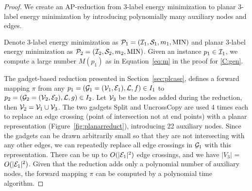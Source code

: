 
\Tplanar*
\begin{proof}



We create an AP-reduction from 3-label energy minimization to planar 3-label energy minimization by introducing polynomially many auxiliary nodes and edges.

Denote 3-label energy minimization as $ \mathcal{P}_1 = (\mathcal{I}_1, \mathcal{S}_1, m_1, \text{MIN})$ and planar 3-label energy minimization as $\mathcal{P}_2 = (\mathcal{I}_2, \mathcal{S}_2, m_2, \text{MIN})$.
Given an instance $p_1 \in \mathcal{I}_1$, we compute a large number $M(p_1)$ as in Equation~\cref{eq:m} in the proof for \cref{C:gen}.

The gadget-based reduction presented in Section~\ref{sec:plcase}, defines a forward mapping $\pi$ from any $p_1 = (\mathcal{G}_1 = (\mathcal{V}_1, \mathcal{E}_1), \mathcal{L}, f) \in I_1$ to $p_2 = (\mathcal{G}_2 = (\mathcal{V}_2, \mathcal{E}_2), \mathcal{L}, g) \in I_2$. Let $\mathcal{V}_3$ be the nodes added during the reduction, then $\mathcal{V}_2 = \mathcal{V}_1 \cup \mathcal{V}_3$. The two gadgets {\sc Split} and {\sc UncrossCopy} are used 4 times each to replace an edge crossing (point of intersection not at end points) with a planar representation (Figure~\ref{fig:planarreduct}), introducing 22 auxiliary nodes. Since the gadgets can be drawn arbitrarily small so that they are not intersecting with any other edges, we can repeatedly replace all edge crossings in $\mathcal{G}_1$ with this representation. There can be up to $O(|\mathcal{E}_1|^2)$ edge crossings,
and we have $|V_3|$ = $O(|\mathcal{E}_1|^2)$.
Given that the reduction adds only a polynomial number of auxiliary nodes, the forward mapping $\pi$ can be computed by a polynomial time algorithm.


\end{proof}
